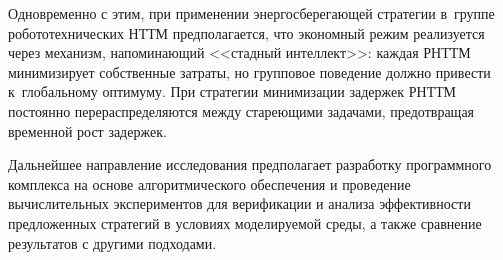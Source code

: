 Одновременно с этим, при применении энергосберегающей стратегии в~группе робототехнических НТТМ предполагается, что экономный режим реализуется через механизм, напоминающий <<стадный интеллект>>: каждая РНТТМ минимизирует собственные затраты, но групповое поведение должно привести к~глобальному оптимуму. При стратегии минимизации задержек РНТТМ постоянно перераспределяются между стареющими задачами, предотвращая временной рост задержек.

Дальнейшее направление исследования предполагает разработку программного комплекса на основе алгоритмического обеспечения и проведение вычислительных экспериментов для верификации и анализа эффективности предложенных стратегий в условиях моделируемой среды, а также сравнение результатов с другими подходами.

\FloatBarrier
